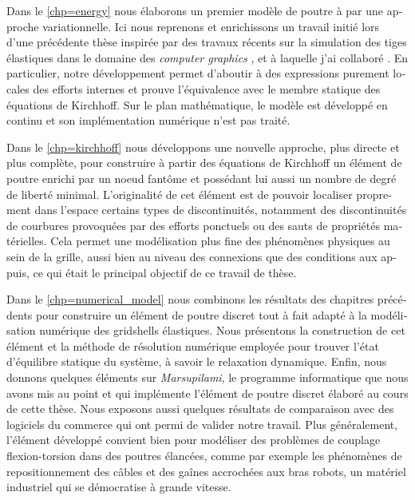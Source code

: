 \begin{otherlanguage}{french}
Dans le \cref{chp=energy} nous élaborons un premier modèle de poutre à  par une approche variationnelle. Ici nous reprenons et enrichissons un travail initié lors d'une précédente thèse \cite{Tayeb2015} inspirée par des travaux récents sur la simulation des tiges élastiques dans le domaine des \emph{computer graphics} \cite{Bergou2008}, et à laquelle j'ai collaboré \cite{DuPeloux2015,Lefevre2017}. En particulier, notre développement permet d'aboutir à des expressions purement locales des efforts internes et prouve l'équivalence avec le membre statique des équations de Kirchhoff. Sur le plan mathématique, le modèle est développé en continu et son implémentation numérique n'est pas traité.

Dans le \cref{chp=kirchhoff} nous développons une nouvelle approche, plus directe et plus complète, pour construire à partir des équations de Kirchhoff un élément de poutre  enrichi par un noeud fantôme et possédant lui aussi un nombre de degré de liberté minimal. L'originalité de cet élément est de pouvoir localiser proprement dans l'espace certains types de discontinuités, notamment des discontinuités de courbures provoquées par des efforts ponctuels ou des sauts de propriétés matérielles. Cela permet une modélisation plus fine des phénomènes physiques au sein de la grille, aussi bien au niveau des connexions que des conditions aux appuis, ce qui était le principal objectif de ce travail de thèse.

Dans le \cref{chp=numerical_model} nous combinons les résultats des chapitres précédents pour construire un élément de poutre discret tout à fait adapté à la modélisation numérique des gridshells élastiques. Nous présentons la construction de cet élément et la méthode de résolution numérique employée pour trouver l'état d'équilibre statique du système, à savoir le relaxation dynamique. Enfin, nous donnons quelques éléments sur \emph{Marsupilami}, le programme informatique que nous avons mis au point et qui implémente l'élément de poutre discret élaboré au cours de cette thèse. Nous exposons aussi quelques résultats de comparaison avec des logiciels du commerce qui ont permi de valider notre travail. Plus généralement, l'élément développé convient bien pour modéliser des problèmes de couplage flexion-torsion dans des poutres élancées, comme par exemple les phénomènes de repositionnement des câbles et des gaînes accrochées aux bras robots, un matériel industriel qui se démocratise à grande vitesse.

\end{otherlanguage}
